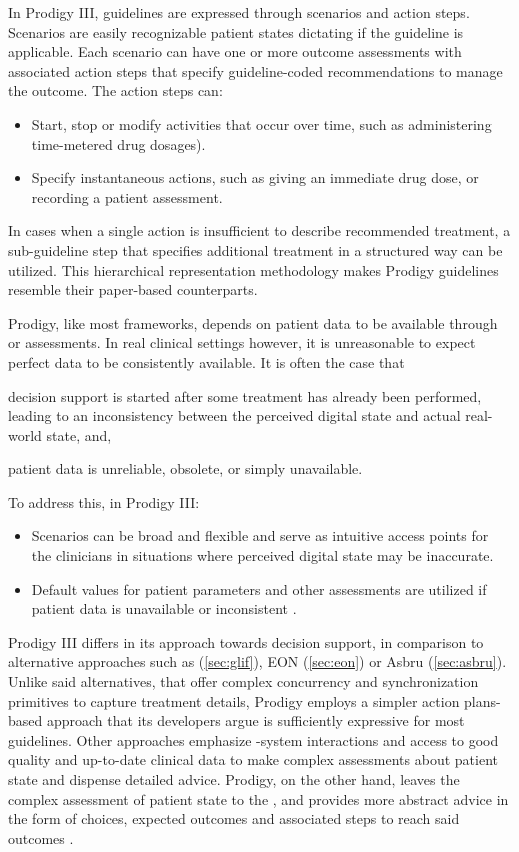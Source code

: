In Prodigy III, guidelines are expressed through scenarios and action steps.
Scenarios are easily recognizable patient states dictating if the guideline
is applicable. Each scenario can have one or more outcome assessments with
associated action steps that specify guideline-coded recommendations to manage
the outcome. The action steps can:
\begin{itemize}
  \item Start, stop or modify activities that occur over time, such as
    administering time-metered drug dosages).
  \item Specify instantaneous actions, such as giving an immediate drug dose,
    or recording a patient assessment.
\end{itemize}
In cases when a single action is insufficient to describe recommended treatment,
a sub-guideline step that specifies additional treatment in a structured way
can be utilized. This hierarchical representation methodology makes Prodigy
guidelines resemble their paper-based counterparts.

Prodigy, like most \CDSSs{} frameworks, depends on patient data to
be available through \EHRs{} or \HCP{} assessments. In real clinical settings
however, it is unreasonable to expect perfect data to be consistently
available. It is often the case that
\begin{enumerate*}[label=(\alph*)]
  \item decision support is started after some treatment has already
    been performed, leading to an inconsistency between the perceived
    digital state and actual real-world state, and,
  \item patient data is unreliable, obsolete, or simply unavailable.
\end{enumerate*}
To address this, in Prodigy III:
\begin{itemize}
  \item Scenarios can be broad and flexible and serve as intuitive access points for
    the clinicians in situations where perceived digital state may be
    inaccurate.
  \item Default values for patient parameters and other assessments are utilized
    if patient data is unavailable or inconsistent \cite{JohnsonAMIA00}.
\end{itemize}

Prodigy III differs in its approach towards decision support, in comparison
to alternative approaches such as \GLIF{} (\autoref{sec:glif}), EON (\autoref{sec:eon})
or Asbru (\autoref{sec:asbru}). Unlike said alternatives,
that offer complex concurrency and synchronization primitives to capture
treatment details, Prodigy employs a simpler action plans-based approach
that its developers argue is sufficiently expressive for most guidelines.
Other approaches emphasize \HCP{}-system interactions and access to good quality
and up-to-date clinical data to make complex assessments about patient state and dispense detailed
advice. Prodigy, on the other hand, leaves the complex assessment of patient
state to the \HCP{}, and provides more abstract advice in the form of choices,
expected outcomes and associated steps to reach said outcomes \cite{JohnsonAMIA00}.

